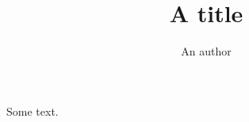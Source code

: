 \documentclass{article}
\title{A title}
\author{An author}
\begin{document}
\maketitle
Some text.
\end{document}
